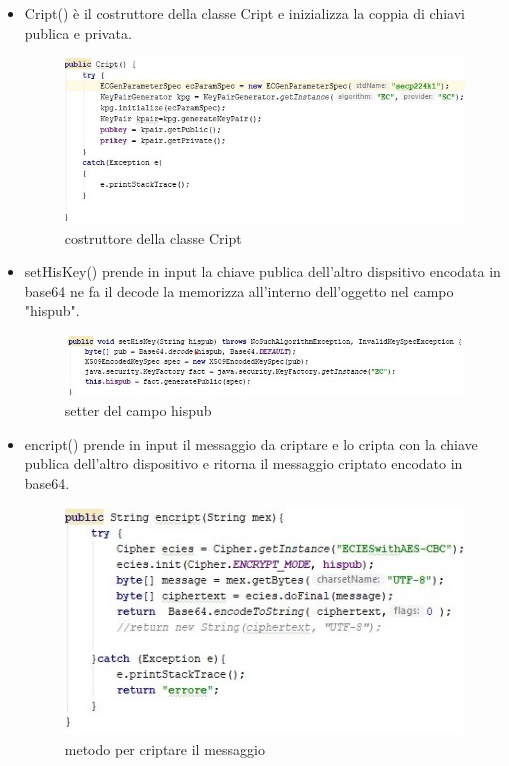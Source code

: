 \begin{itemize}
    \item Cript() è il costruttore della classe Cript e
    inizializza la coppia di chiavi publica e privata. 
    \begin{figure}
        \caption{costruttore della classe Cript}
        \includegraphics[width=0.8\columnwidth]{imgs/Criptconstructor.jpg}
    \end{figure}

    \item setHisKey() prende in input la chiave publica dell'altro dispsitivo
    encodata in base64 ne fa il decode la memorizza all'interno dell'oggetto
    nel campo "hispub".
    \begin{figure}
        \caption{setter del campo hispub}
        \includegraphics[width=0.9  \columnwidth]{imgs/sethiskey.jpg}
    \end{figure}



    \item encript() prende in input il messaggio da criptare e lo cripta con la
    chiave publica dell'altro dispositivo e ritorna il messaggio criptato
    encodato in base64.
    \begin{figure}
        \caption{metodo per criptare il messaggio}
        \includegraphics[width=0.5  \columnwidth]{imgs/encript.jpg}
    \end{figure}


\end{itemize}
